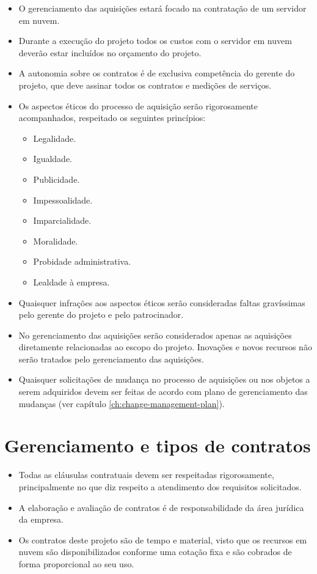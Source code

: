 \begin{itemize}
	\item O gerenciamento das aquisições estará focado na contratação de um servidor em nuvem.
	\item Durante a execução do projeto todos os custos com o servidor em nuvem deverão estar incluídos no orçamento do projeto.
	\item A autonomia sobre os contratos é de exclusiva competência do gerente do projeto, que deve assinar todos os contratos e medições de serviços.
	\item Os aspectos éticos do processo de aquisição serão rigorosamente acompanhados, respeitado os seguintes princípios:
	      \begin{itemize}
		      \item Legalidade.
		      \item Igualdade.
		      \item Publicidade.
		      \item Impessoalidade.
		      \item Imparcialidade.
		      \item Moralidade.
		      \item Probidade administrativa.
		      \item Lealdade à empresa.
	      \end{itemize}
	\item Quaisquer infrações aos aspectos éticos serão consideradas faltas gravíssimas pelo gerente do projeto e pelo patrocinador.
	\item No gerenciamento das aquisições serão considerados apenas as aquisições diretamente relacionadas ao escopo do projeto. Inovações e novos recursos não serão tratados pelo gerenciamento das aquisições.
	\item Quaisquer solicitações de mudança no processo de aquisições ou nos objetos a serem adquiridos devem ser feitas de acordo com plano de gerenciamento das mudanças (ver capítulo \ref{ch:change-management-plan}).
\end{itemize}

\section{Gerenciamento e tipos de contratos}

\begin{itemize}
	\item Todas as cláusulas contratuais devem ser respeitadas rigorosamente, principalmente no que diz respeito a atendimento dos requisitos solicitados.
	\item A elaboração e avaliação de contratos é de responsabilidade da área jurídica da empresa.
	\item Os contratos deste projeto são de tempo e material, visto que os recursos em nuvem são disponibilizados conforme uma cotação fixa e são cobrados de forma proporcional ao seu uso.
\end{itemize}

